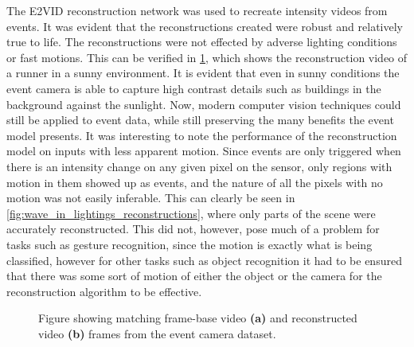 The E2VID reconstruction network was used to recreate intensity videos from events. It was evident that the reconstructions created were robust and relatively true to life. The reconstructions were not effected by adverse lighting conditions or fast motions. This can be verified in \cref{fig:intensity_reconstructed_frames}, which shows the reconstruction video of a runner in a sunny environment. It is evident that even in sunny conditions the event camera is able to capture high contrast details such as buildings in the background against the sunlight. Now, modern computer vision techniques could still be applied to event data, while still preserving the many benefits the event model presents. It was interesting to note the performance of the reconstruction model on inputs with less apparent motion. Since events are only triggered when there is an intensity change on any given pixel on the sensor, only regions with motion in them showed up as events, and the nature of all the pixels with no motion was not easily inferable. This can clearly be seen in \cref{fig:wave_in_lightings_reconstructions}, where only parts of the scene were accurately reconstructed. This did not, however, pose much of a problem for tasks such as gesture recognition, since the motion is exactly what is being classified, however for other tasks such as object recognition it had to be ensured that there was some sort of motion of either the object or the camera for the reconstruction algorithm to be effective.

\begin{figure}[htb]%
    \centering
    \qquad
    \caption{Figure showing matching frame-base video \textbf{(a)} and reconstructed video \textbf{(b)} frames from the event camera dataset\cite{EventCameraDataset}.}%
    \label{fig:intensity_reconstructed_frames}%
\end{figure}

